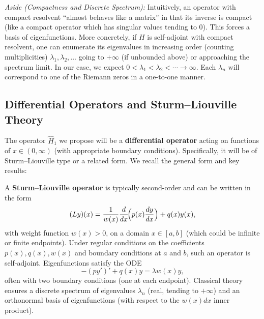 \documentclass[12pt]{article}
\theoremstyle{plain}
\theoremstyle{definition}
\begin{document}
\textit{Aside (Compactness and Discrete Spectrum):} Intuitively, an operator with compact resolvent ``almost behaves like a matrix'' in that its inverse is compact (like a compact operator which has singular values tending to 0). This forces a basis of eigenfunctions. More concretely, if \(H\) is self-adjoint with compact resolvent, one can enumerate its eigenvalues in increasing order (counting multiplicities) \(\lambda_1,\lambda_2,\ldots\) going to \(+\infty\) (if unbounded above) or approaching the spectrum limit. In our case, we expect \(0 < \lambda_1 < \lambda_2 < \cdots \to \infty\). Each \(\lambda_n\) will correspond to one of the Riemann zeros in a one-to-one manner.

\subsection{Differential Operators and Sturm--Liouville Theory}

The operator \(\hat{H}_1\) we propose will be a \textbf{differential operator} acting on functions of \(x\in(0,\infty)\) (with appropriate boundary conditions). Specifically, it will be of Sturm--Liouville type or a related form. We recall the general form and key results:

A \textbf{Sturm--Liouville operator} is typically second-order and can be written in the form 
\[
(L y)(x) = \frac{1}{w(x)}\frac{d}{dx}\!\Bigl(p(x)\frac{dy}{dx}\Bigr) + q(x) y(x),
\]
with weight function \(w(x)>0\), on a domain \(x\in [a,b]\) (which could be infinite or finite endpoints). Under regular conditions on the coefficients \(p(x), q(x), w(x)\) and boundary conditions at \(a\) and \(b\), such an operator is self-adjoint. Eigenfunctions satisfy the ODE
\[
-(py')' + q(x)y = \lambda w(x) y,
\]
often with two boundary conditions (one at each endpoint). Classical theory ensures a discrete spectrum of eigenvalues \(\lambda_n\) (real, tending to \(+\infty\)) and an orthonormal basis of eigenfunctions (with respect to the \(w(x)dx\) inner product).
\end{document}
